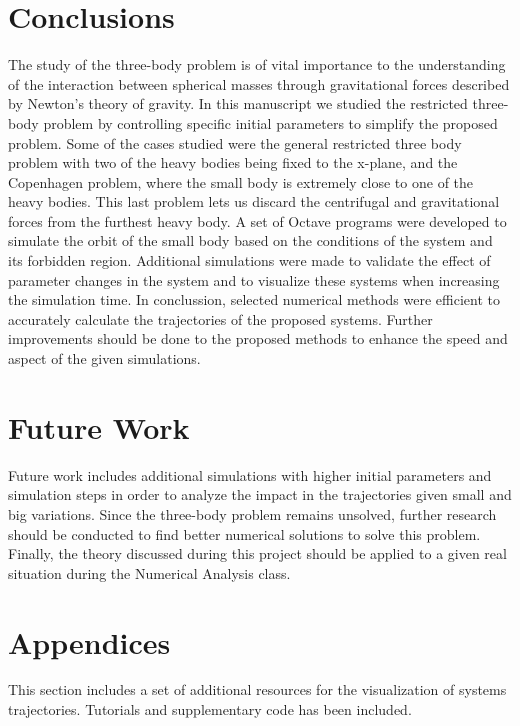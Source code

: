 \documentclass{article}
\begin{document}
\section{Conclusions}

The study of the three-body problem is of vital importance to the understanding of the interaction between spherical masses through gravitational forces described by Newton’s theory of gravity. In this manuscript we studied the restricted three-body problem by controlling specific initial parameters to simplify the proposed problem. Some of the cases studied were the general restricted three body problem with two of the heavy bodies being fixed to the x-plane, and the Copenhagen problem, where the small body is extremely close to one of the heavy bodies. This last problem lets us discard the centrifugal and gravitational forces from the furthest heavy body. A set of Octave programs were developed to simulate the orbit of the small body based on the conditions of the system and its forbidden region. Additional simulations were made to validate the effect of parameter changes in the system and to visualize these systems when increasing the simulation time. In conclussion, selected numerical methods were efficient to accurately calculate the trajectories of the proposed systems. Further improvements should be done to the proposed methods to enhance the speed and aspect of the given simulations.

\section{Future Work}

Future work includes additional simulations with higher initial parameters and simulation steps in order to analyze the impact in the trajectories given small and big variations. Since the three-body problem remains unsolved, further research should be conducted to find better numerical solutions to solve this problem. Finally, the theory discussed during this project should be applied to a given real situation during the Numerical Analysis class.

\section{Appendices}

This section includes a set of additional resources for the visualization of systems trajectories. Tutorials and supplementary code has been included. 
\end{document}
